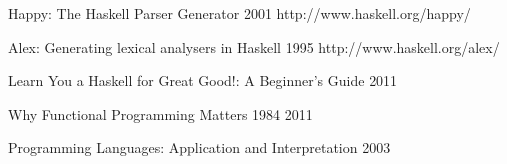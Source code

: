 
\begingroup
\renewcommand{\section}[2]{}%

\begin{thebibliography}{99}

  {Happy: The Haskell Parser Generator}
  {2001}
  {http://www.haskell.org/happy/}

  {Alex: Generating lexical analysers in Haskell}
  {1995}
  {http://www.haskell.org/alex/}

  {Learn You a Haskell for Great Good!: A Beginner's Guide}
  {2011}

  {Why Functional Programming Matters}
  {1984}
  {2011}

  {Programming Languages: Application and Interpretation}
  {2003}

\end{thebibliography}

\endgroup